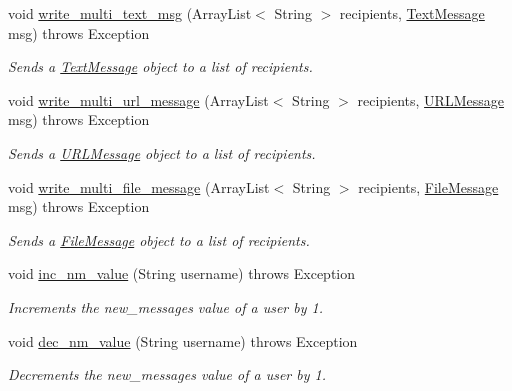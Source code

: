 \begin{DoxyCompactItemize}
void \hyperlink{class_read_write_message_a2a509bda22a84d2b46949c71984d205c}{write\+\_\+multi\+\_\+text\+\_\+msg} (Array\+List$<$ String $>$ recipients, \hyperlink{class_text_message}{Text\+Message} msg)  throws Exception     
\begin{DoxyCompactList}\small\item\em Sends a \hyperlink{class_text_message}{Text\+Message} object to a list of recipients. \end{DoxyCompactList}\item 
void \hyperlink{class_read_write_message_a9a005ffe1f6fd45a7490890e199731d5}{write\+\_\+multi\+\_\+url\+\_\+message} (Array\+List$<$ String $>$ recipients, \hyperlink{class_u_r_l_message}{U\+R\+L\+Message} msg)  throws Exception     
\begin{DoxyCompactList}\small\item\em Sends a \hyperlink{class_u_r_l_message}{U\+R\+L\+Message} object to a list of recipients. \end{DoxyCompactList}\item 
void \hyperlink{class_read_write_message_a8d406199a35776861428f76038aa5dc4}{write\+\_\+multi\+\_\+file\+\_\+message} (Array\+List$<$ String $>$ recipients, \hyperlink{class_file_message}{File\+Message} msg)  throws Exception     
\begin{DoxyCompactList}\small\item\em Sends a \hyperlink{class_file_message}{File\+Message} object to a list of recipients. \end{DoxyCompactList}\item 
void \hyperlink{class_read_write_message_ab95207fb27ef92136d39b454e7826fc5}{inc\+\_\+nm\+\_\+value} (String username)  throws Exception     
\begin{DoxyCompactList}\small\item\em Increments the new\+\_\+messages value of a user by 1. \end{DoxyCompactList}\item 
void \hyperlink{class_read_write_message_a92a8e0f94a1b67491af6a7fbfdb52501}{dec\+\_\+nm\+\_\+value} (String username)  throws Exception     
\begin{DoxyCompactList}\small\item\em Decrements the new\+\_\+messages value of a user by 1. \end{DoxyCompactList}\end{DoxyCompactItemize}
